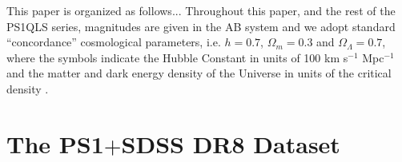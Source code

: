 \documentclass[useAMS,usenatbib]{mn2e}
\begin{document}

















































This paper is organized as follows... Throughout this paper, and the
rest of the PS1QLS series, magnitudes are given in the AB system
\citep{Oke74} and we adopt standard ``concordance'' cosmological
parameters, i.e. $h=0.7$, $\Omega_m=0.3$ and $\Omega_\Lambda=0.7$, where
the symbols indicate the Hubble Constant in units of 100 km s$^{-1}$
Mpc$^{-1}$ and the matter and dark energy density of the Universe in
units of the critical density \citep[e.g.\ ][]{Kom++09}.



\section{The PS1$+$SDSS DR8 Dataset}
\label{sec:data}

\end{document}
